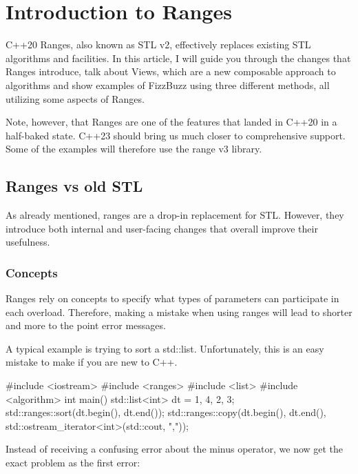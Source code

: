 \chapter{Introduction to Ranges}

C++20 Ranges, also known as STL v2, effectively replaces existing STL algorithms and facilities. In this article, I will guide you through the changes that Ranges introduce, talk about Views, which are a new composable approach to algorithms and show examples of FizzBuzz using three different methods, all utilizing some aspects of Ranges.

Note, however, that Ranges are one of the features that landed in C++20 in a half-baked state. C++23 should bring us much closer to comprehensive support. Some of the examples will therefore use the range v3 library.

\section{Ranges vs old STL}

As already mentioned, ranges are a drop-in replacement for STL. However, they introduce both internal and user-facing changes that overall improve their usefulness.

\subsection{Concepts}

Ranges rely on concepts to specify what types of parameters can participate in each overload. Therefore, making a mistake when using ranges will lead to shorter and more to the point error messages.

A typical example is trying to sort a std::list. Unfortunately, this is an easy mistake to make if you are new to C++.

\begin{box-note}
\begin{cppcode}
#include <iostream>
#include <ranges>
#include <list>
#include <algorithm>
int main() {
    std::list<int> dt = {1, 4, 2, 3};
    std::ranges::sort(dt.begin(), dt.end());
    std::ranges::copy(dt.begin(), dt.end(), 
        std::ostream_iterator<int>(std::cout, ","));
}
\end{cppcode}
\end{box-note}

Instead of receiving a confusing error about the minus operator, we now get the exact problem as the first error:

